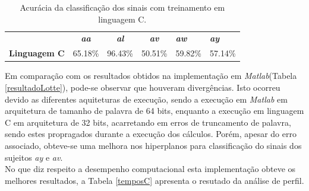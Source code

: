\begin{table}[!h]
	\centering
	\caption{Acurácia da classificação dos sinais com treinamento em linguagem C.}
	\label{acuraciaC}
	
	\begin{tabular}{lcccll}
		\rowcolor[HTML]{DAE8FC} 
		\multicolumn{1}{c}{\cellcolor[HTML]{DAE8FC}\textbf{Sistema}} & \textit{\textbf{aa}}        & \textit{\textbf{al}}        & \textit{\textbf{av}}        & \textit{\textbf{aw}} & \textit{\textbf{ay}} \\
		\textbf{Linguagem C}                                        & \multicolumn{1}{r}{65.18\%} & \multicolumn{1}{r}{96.43\%} & \multicolumn{1}{r}{50.51\%} & 59.82\%              & 57.14\%             
	\end{tabular}
\end{table}

Em comparação com os resultados obtidos na implementação em \textit{Matlab}(Tabela \ref{resultadoLotte}), pode-se observar que houveram divergências. Isto ocorreu devido as diferentes aquiteturas de execução, sendo a execução em \textit{Matlab} em arquitetura de tamanho de palavra de 64 bits, enquanto a execução em linguagem C em arquitetura de 32 bits, acarretando em erros de truncamento de palavra, sendo estes propragados durante a execução dos cálculos. Porém, apesar do erro associado, obteve-se uma melhora nos hiperplanos para classificação do sinais dos sujeitos \textit{ay} e \textit{av}.\\

No que diz respeito a desempenho computacional esta implementação obteve os melhores resultados, a Tabela \ref{temposC} apresenta o resutado da análise de perfil.  

